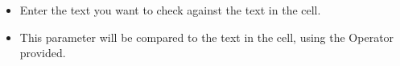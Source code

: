 
 \begin{itemize}
\item Enter the text you want to check against the text in the cell.
\item This parameter will be compared to the text in the cell, using the Operator provided.
\end{itemize} 

